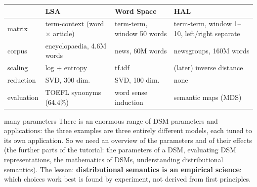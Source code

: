 \begin{center}
\end{center}

\begin{center}
\small
\begin{tabularx}{\linewidth}{@{}l >{\raggedright\arraybackslash}X >{\raggedright\arraybackslash}X >{\raggedright\arraybackslash}X@{}}
\toprule
 & \textbf{LSA} & \textbf{Word Space} & \textbf{HAL} \\
\midrule
matrix & term-context (word $\times$ article) & term-term, window 50 words & term-term,
  window 1--10, left/right separate \\
corpus & encyclopaedia, 4.6M words & news, 60M words & newsgroups, 160M words \\
scaling & log + entropy & tf.idf & (later) inverse distance \\
reduction & SVD, 300 dim. & SVD, 100 dim. & none \\
evaluation & TOEFL synonyms (64.4\%) & word sense induction & semantic maps (MDS) \\
\bottomrule
\end{tabularx}
\end{center}

\begin{nbfact}{many parameters}
There is an enormous range of DSM parameters and applications: the three examples are
three entirely different models, each tuned to its own application. So we need an
overview of the parameters and of their effects (the further parts of the tutorial: the
parameters of a DSM, evaluating DSM representations, the mathematics of DSMs,
understanding distributional semantics). The lesson: \textbf{distributional semantics is
an empirical science}: which choices work best is found by experiment, not derived from
first principles.
\end{nbfact}

